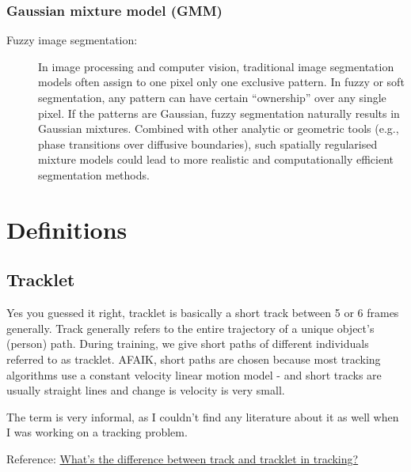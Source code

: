 \documentclass[a4paper,11pt]{article}
\begin{document}
\subsubsection{Gaussian mixture model (GMM)}
\begin{description}
    \item[Fuzzy image segmentation:] In image processing and computer vision, traditional image segmentation models often assign to one pixel only one exclusive pattern. In fuzzy or soft segmentation, any pattern can have certain ``ownership'' over any single pixel. If the patterns are Gaussian, fuzzy segmentation naturally results in Gaussian mixtures. Combined with other analytic or geometric tools (e.g., phase transitions over diffusive boundaries), such spatially regularised mixture models could lead to more realistic and computationally efficient segmentation methods.
\end{description}

\section{Definitions}
\subsection{Tracklet}
\label{def:tracklet}
Yes you guessed it right, tracklet is basically a short track between 5 or 6 frames generally. Track generally refers to the entire trajectory of a unique object's (person) path. During training, we give short paths of different individuals referred to as tracklet. AFAIK, short paths are chosen because most tracking algorithms use a constant velocity linear motion model - and short tracks are usually straight lines and change is velocity is very small.

The term is very informal, as I couldn't find any literature about it as well when I was working on a tracking problem.

Reference: \href{https://stackoverflow.com/questions/55512548/whats-the-difference-between-track-and-tracklet-in-tracking}{What's the difference between track and tracklet in tracking?}

\printbibliography
\end{document}

